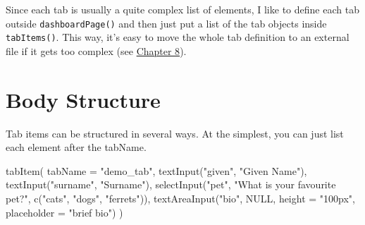 \documentclass[
]{book}
\newenvironment{Shaded}{\begin{snugshade}}{\end{snugshade}}
\newcommand{\AttributeTok}[1]{\textcolor[rgb]{0.77,0.63,0.00}{#1}}
\newcommand{\CommentTok}[1]{\textcolor[rgb]{0.56,0.35,0.01}{\textit{#1}}}
\newcommand{\ConstantTok}[1]{\textcolor[rgb]{0.00,0.00,0.00}{#1}}
\newcommand{\FunctionTok}[1]{\textcolor[rgb]{0.00,0.00,0.00}{#1}}
\newcommand{\NormalTok}[1]{#1}
\newcommand{\SpecialCharTok}[1]{\textcolor[rgb]{0.00,0.00,0.00}{#1}}
\newcommand{\StringTok}[1]{\textcolor[rgb]{0.31,0.60,0.02}{#1}}
\begin{document}
\begin{Shaded}
\end{Shaded}

Since each tab is usually a quite complex list of elements, I like to define each tab outside \texttt{dashboardPage()} and then just put a list of the tab objects inside \texttt{tabItems()}. This way, it's easy to move the whole tab definition to an external file if it gets too complex (see \protect\hyperlink{structure}{Chapter 8}).

\hypertarget{body-structure}{%
\section{Body Structure}\label{body-structure}}

Tab items can be structured in several ways. At the simplest, you can just list each element after the tabName.

\begin{Shaded}
\begin{Highlighting}[]
\FunctionTok{tabItem}\NormalTok{(}
    \AttributeTok{tabName =} \StringTok{"demo\_tab"}\NormalTok{,}
    \FunctionTok{textInput}\NormalTok{(}\StringTok{"given"}\NormalTok{, }\StringTok{"Given Name"}\NormalTok{),}
    \FunctionTok{textInput}\NormalTok{(}\StringTok{"surname"}\NormalTok{, }\StringTok{"Surname"}\NormalTok{),}
    \FunctionTok{selectInput}\NormalTok{(}\StringTok{"pet"}\NormalTok{, }\StringTok{"What is your favourite pet?"}\NormalTok{, }\FunctionTok{c}\NormalTok{(}\StringTok{"cats"}\NormalTok{, }\StringTok{"dogs"}\NormalTok{, }\StringTok{"ferrets"}\NormalTok{)),}
    \FunctionTok{textAreaInput}\NormalTok{(}\StringTok{"bio"}\NormalTok{, }\ConstantTok{NULL}\NormalTok{, }\AttributeTok{height =} \StringTok{"100px"}\NormalTok{, }\AttributeTok{placeholder =} \StringTok{"brief bio"}\NormalTok{)}
\NormalTok{)}
\end{Highlighting}
\end{Shaded}
\end{document}
